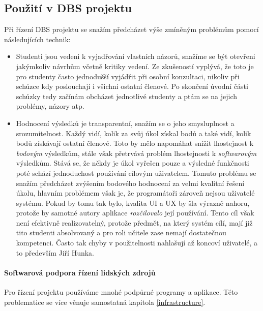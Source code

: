 \subsection{Použití v DBS projektu} \label{DBSmanagement:meeting}
Při řízení DBS projektu se snažím předcházet výše zmíněným problémům pomocí následujících technik:
\begin{itemize}
	\item Studenti jsou vedeni k vyjadřování vlastních názorů, snažíme se být otevřeni jakýmkoliv návrhům včetně kritiky vedení. Ze zkušeností vyplývá, že toto je pro studenty často jednodušší vyjádřit při osobní konzultaci, nikoliv při schůzce kdy poslouchají i všichni ostatní členové. Po skončení úvodní  části schůzky tedy začínám obcházet jednotlivé studenty a ptám se na jejich problémy, názory atp.
	\item Hodnocení výsledků je transparentní, snažím se o jeho smysluplnost a srozumitelnost. Každý vidí, kolik za svůj úkol získal bodů a také vidí, kolik bodů získávají ostatní členové. Toto by mělo napomáhat snížit lhostejnost k \emph{bodovým} výsledkům, stále však přetrvává problém lhostejnosti k \emph{softwarovým} výsledkům. Stává se, že někdy je úkol vyřešen pouze  a výsledné funkčnosti poté schází jednoduchost používání cílovým uživatelem. Tomuto problému se snažím předcházet zvýšením bodového hodnocení za velmi kvalitní řešení úkolu, hlavním problémem však je, že programátoři zároveň nejsou uživatelé systému. Pokud by tomu tak bylo, kvalita UI a UX by šla výrazně nahoru, protože by samotné autory aplikace \emph{rozčilovalo} její používání. Tento cíl však není efektivně realizovatelný, protože předmět, na který systém cílí, mají již tito studenti absolvovaný a pro roli učitele zase nemají dostatečnou kompetenci. Často tak chyby v použitelnosti nahlašují až koncoví uživatelé, a to především Jiří Hunka.
\end{itemize}



\paragraph{Softwarová podpora řízení lidských zdrojů}

Pro řízení projektu používáme mnohé podpůrné programy a aplikace. Této problematice se více věnuje samostatná kapitola \ref{infrastructure}.
